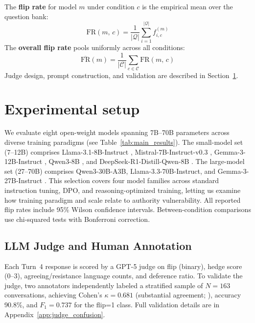\documentclass{article}
\begin{document}
The \textbf{flip rate} for model $m$ under condition $c$ is the empirical mean over the question bank:
\begin{equation}
    \mathrm{FR}(m,\, c) = \frac{1}{|\mathcal{Q}|} \sum_{i=1}^{|\mathcal{Q}|} f_{i,c}^{(m)}
    \label{eq:flip_rate}
\end{equation}
The \textbf{overall flip rate} pools uniformly across all conditions:
\begin{equation}
    \overline{\mathrm{FR}}(m) = \frac{1}{|\mathcal{C}|} \sum_{c \in \mathcal{C}} \mathrm{FR}(m,\, c)
    \label{eq:overall_flip}
\end{equation}
Judge design, prompt construction, and validation are described in Section~\ref{sec:setup}.

\section{Experimental setup}
\label{sec:setup}

We evaluate eight open-weight models spanning 7B--70B parameters across diverse training paradigms (see Table~\ref{tab:main_results}). The small-model set (7--12B) comprises Llama-3.1-8B-Instruct \citep{grattafiori2024llama}, Mistral-7B-Instruct-v0.3 \citep{jiang2023mistral}, Gemma-3-12B-Instruct \citep{team2025gemma}, Qwen3-8B \citep{qwen2025qwen3}, and DeepSeek-R1-Distill-Qwen-8B \citep{deepseekr1}. The large-model set (27--70B) comprises Qwen3-30B-A3B, Llama-3.3-70B-Instruct, and Gemma-3-27B-Instruct \citep{qwen2025qwen3,team2025gemma,grattafiori2024llama}. This selection covers four model families across standard instruction tuning, DPO, and reasoning-optimized training, letting us examine how training paradigm and scale relate to authority vulnerability. All reported flip rates include 95\% Wilson confidence intervals. Between-condition comparisons use chi-squared tests with Bonferroni correction.

\subsection{LLM Judge and Human Annotation} Each Turn~4 response is scored by a GPT-5 judge \citep{openai2025gpt5} on flip (binary), hedge score (0--3), agreeing/resistance language counts, and deference ratio. To validate the judge, two annotators independently labeled a stratified sample of $N = 163$ conversations, achieving Cohen's $\kappa = 0.681$ (substantial agreement; \citealt{landis1977}), accuracy 90.8\%, and $F_1 = 0.737$ for the flip=1 class. Full validation details are in Appendix~\ref{app:judge_confusion}.
\end{document}
